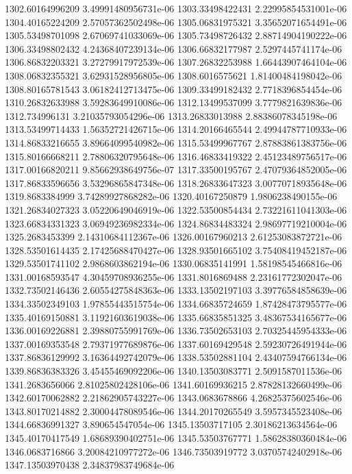 {1302.60164996209 3.49991480956731e-06
1303.33498422431 2.22995854531001e-06
1304.40165224209 2.57057362502498e-06
1305.06831975321 3.35652071654491e-06
1305.53498701098 2.67069741033069e-06
1305.73498726432 2.88714904190222e-06
1306.33498802432 4.24368407239134e-06
1306.66832177987 2.5297445741174e-06
1306.86832203321 3.27279917972539e-06
1307.26832253988 1.66443907464104e-06
1308.06832355321 3.62931528956805e-06
1308.6016575621 1.81400484198042e-06
1308.80165781543 3.06182412713475e-06
1309.33499182432 2.7718396854454e-06
1310.26832633988 3.59283649910086e-06
1312.13499537099 3.7779821639836e-06
1312.734996131 3.21035793054296e-06
1313.26833013988 2.88386078345198e-06
1313.53499714433 1.56352721426715e-06
1314.20166465544 2.49944787710933e-06
1314.86833216655 3.89664099540982e-06
1315.53499967767 2.87883861383756e-06
1315.80166668211 2.78806320795648e-06
1316.46833419322 2.45123489756517e-06
1317.00166820211 9.85662938649756e-07
1317.33500195767 2.47079364852005e-06
1317.86833596656 3.53296865847348e-06
1318.26833647323 3.00770718935648e-06
1319.8683384999 3.74289927868282e-06
1320.40167250879 1.9806238490155e-06
1321.26834027323 3.05220649046919e-06
1322.53500854434 2.73221611041303e-06
1323.66834331323 3.06949236982334e-06
1324.86834483324 2.98697719210004e-06
1325.2683453399 2.14310684112367e-06
1326.00167960213 2.61253083872721e-06
1328.53501614435 2.17425688470427e-06
1328.93501665102 3.75408419452187e-06
1329.53501741102 2.9868603862194e-06
1330.06835141991 1.58198545466816e-06
1331.00168593547 4.30459708936255e-06
1331.8016869488 2.23161772302047e-06
1332.73502146436 2.60554275848363e-06
1333.13502197103 3.39776584858639e-06
1334.33502349103 1.97855443515754e-06
1334.66835724659 1.87428473795577e-06
1335.40169150881 3.11921603619038e-06
1335.66835851325 3.48367534165677e-06
1336.00169226881 2.39880755991769e-06
1336.73502653103 2.70325445954333e-06
1337.00169353548 2.79371977689876e-06
1337.60169429548 2.59230726491944e-06
1337.86836129992 3.16364492742079e-06
1338.53502881104 2.43407594766134e-06
1339.86836383326 3.45455469092206e-06
1340.13503083771 2.5091587011536e-06
1341.2683656066 2.81025802428106e-06
1341.60169936215 2.87828132660499e-06
1342.60170062882 2.21862905743227e-06
1343.0683678866 4.26825375602546e-06
1343.80170214882 2.30004478089546e-06
1344.20170265549 3.5957345523408e-06
1344.66836991327 3.890654547054e-06
1345.13503717105 2.30186213634564e-06
1345.40170417549 1.68689390402751e-06
1345.53503767771 1.58628380360484e-06
1346.0683716866 3.20084210977272e-06
1346.73503919772 3.03705742402918e-06
1347.13503970438 2.34837983749684e-06
}
